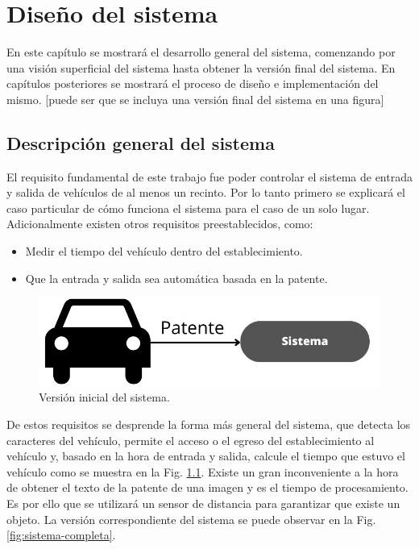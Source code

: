 \chapter{Diseño del sistema}

En este capítulo se mostrará el desarrollo general del sistema, comenzando por una visión superficial del sistema hasta obtener la versión final del sistema. En capítulos posteriores se mostrará el proceso de diseño e implementación del mismo. [puede ser que se incluya una versión final del sistema en una figura]

\section{Descripción general del sistema}

El requisito fundamental de este trabajo fue poder controlar el sistema de entrada y salida de vehículos de al menos un recinto. Por lo tanto primero se explicará el caso particular de cómo funciona el sistema para el caso de un solo lugar. Adicionalmente existen otros requisitos preestablecidos, como:

\begin{itemize}
    \item Medir el tiempo del vehículo dentro del establecimiento.
    \item Que la entrada y salida sea automática basada en la patente.
\end{itemize}

\begin{figure}[bth]
    \centering
    \includegraphics[width=.8\textwidth]{imgs/sistema-base.png}
    \caption{Versión inicial del sistema.}
    \label{fig:sistema-base}
\end{figure}

De estos requisitos se desprende la forma más general del sistema, que detecta los caracteres del vehículo, permite el acceso o el egreso del establecimiento al vehículo y, basado en la hora de entrada y salida, calcule el tiempo que estuvo el vehículo como se muestra en la Fig. \ref{fig:sistema-base}.
Existe un gran inconveniente a la hora de obtener el texto de la patente de una imagen y es el tiempo de procesamiento. Es por ello que se utilizará un sensor de distancia para garantizar que existe un objeto.
La versión correspondiente del sistema se puede observar en la Fig. \ref{fig:sistema-completa}.

